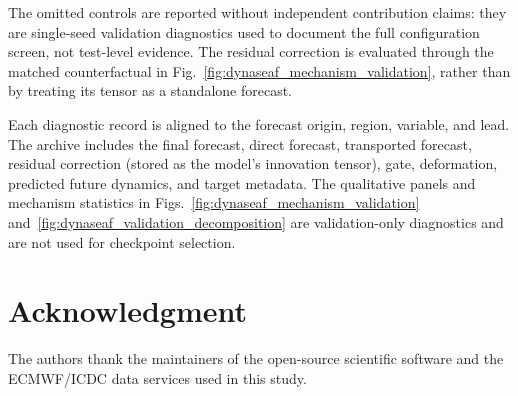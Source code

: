\documentclass[conference]{IEEEtran}
\begin{document}
The omitted controls are reported without independent contribution claims: they are single-seed validation diagnostics used to document the full configuration screen, not test-level evidence. The residual correction is evaluated through the matched counterfactual in Fig.~\ref{fig:dynaseaf_mechanism_validation}, rather than by treating its tensor as a standalone forecast.

Each diagnostic record is aligned to the forecast origin, region, variable, and lead. The archive includes the final forecast, direct forecast, transported forecast, residual correction (stored as the model's innovation tensor), gate, deformation, predicted future dynamics, and target metadata. The qualitative panels and mechanism statistics in Figs.~\ref{fig:dynaseaf_mechanism_validation} and~\ref{fig:dynaseaf_validation_decomposition} are validation-only diagnostics and are not used for checkpoint selection.
\FloatBarrier

\section*{Acknowledgment}
The authors thank the maintainers of the open-source scientific software and the ECMWF/ICDC data services used in this study.

\makeatletter
\patchcmd{\thebibliography}{\footnotesize}{\scriptsize}{}{}
\makeatother


\end{document}

